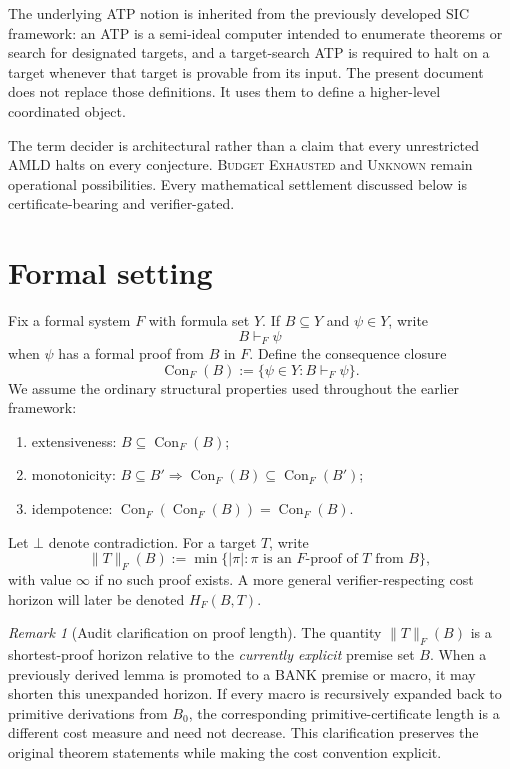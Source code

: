 \documentclass[11pt]{article}
\theoremstyle{remark}
\newtheorem{remark}[definition]{Remark}
\newcommand{\Con}{\operatorname{Con}}
\begin{document}
The underlying ATP notion is inherited from the previously developed SIC framework: an ATP is a semi-ideal computer intended to enumerate theorems or search for designated targets, and a target-search ATP is required to halt on a target whenever that target is provable from its input. The present document does not replace those definitions. It uses them to define a higher-level coordinated object.

The term decider is architectural rather than a claim that every unrestricted AMLD halts on every conjecture. \textsc{Budget Exhausted} and \textsc{Unknown} remain operational possibilities. Every mathematical settlement discussed below is certificate-bearing and verifier-gated.

\section{Formal setting}
Fix a formal system $F$ with formula set $Y$. If $B\subseteq Y$ and $\psi\in Y$, write
\[
B\vdash_F\psi
\]
when $\psi$ has a formal proof from $B$ in $F$. Define the consequence closure
\[
\Con_F(B):=\{\psi\in Y:B\vdash_F\psi\}.
\]
We assume the ordinary structural properties used throughout the earlier framework:
\begin{enumerate}[label=(\roman*)]
\item extensiveness: $B\subseteq\Con_F(B)$;
\item monotonicity: $B\subseteq B'\Rightarrow\Con_F(B)\subseteq\Con_F(B')$;
\item idempotence: $\Con_F(\Con_F(B))=\Con_F(B)$.
\end{enumerate}
Let $\bot$ denote contradiction. For a target $T$, write
\[
\lVert T\rVert_F(B):=\min\{\lvert\pi\rvert:\pi\text{ is an $F$-proof of $T$ from $B$}\},
\]
with value $\infty$ if no such proof exists. A more general verifier-respecting cost horizon will later be denoted $H_F(B,T)$.

\begin{remark}[Audit clarification on proof length]
The quantity $\lVert T\rVert_F(B)$ is a shortest-proof horizon relative to the \emph{currently explicit} premise set $B$. When a previously derived lemma is promoted to a BANK premise or macro, it may shorten this unexpanded horizon. If every macro is recursively expanded back to primitive derivations from $B_0$, the corresponding primitive-certificate length is a different cost measure and need not decrease. This clarification preserves the original theorem statements while making the cost convention explicit.
\end{remark}
\end{document}
